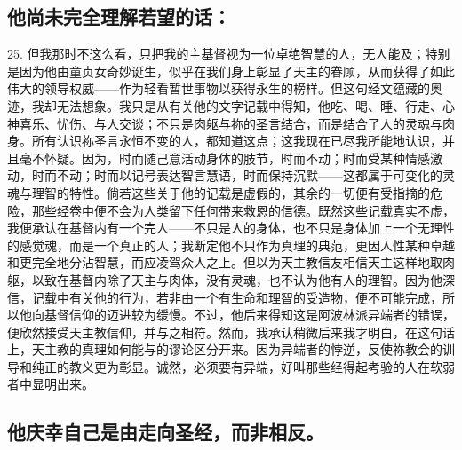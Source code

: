 
\subsection{他尚未完全理解若望的话：}

25. 但我那时不这么看，只把我的主基督视为一位卓绝智慧的人，无人能及；特别是因为他由童贞女奇妙诞生，似乎在我们身上彰显了天主的眷顾，从而获得了如此伟大的领导权威——作为轻看暂世事物以获得永生的榜样。但这句经文蕴藏的奥迹，我却无法想象。我只是从有关他的文字记载中得知，他吃、喝、睡、行走、心神喜乐、忧伤、与人交谈；不只是肉躯与祢的圣言结合，而是结合了人的灵魂与肉身。所有认识祢圣言永恒不变的人，都知道这点；这我现在已尽我所能地认识，并且毫不怀疑。因为，时而随己意活动身体的肢节，时而不动；时而受某种情感激动，时而不动；时而以记号表达智言慧语，时而保持沉默——这都属于可变化的灵魂与理智的特性。倘若这些关于他的记载是虚假的，其余的一切便有受指摘的危险，那些经卷中便不会为人类留下任何带来救恩的信德。既然这些记载真实不虚，我便承认在基督内有一个完人——不只是人的身体，也不只是身体加上一个无理性的感觉魂，而是一个真正的人；我断定他不只作为真理的典范，更因人性某种卓越和更完全地分沾智慧，而应凌驾众人之上。但以为天主教信友相信天主这样地取肉躯，以致在基督内除了天主与肉体，没有灵魂，也不认为他有人的理智。因为他深信，记载中有关他的行为，若非由一个有生命和理智的受造物，便不可能完成，所以他向基督信仰的迈进较为缓慢。不过，他后来得知这是阿波林派异端者的错误，便欣然接受天主教信仰，并与之相符。然而，我承认稍微后来我才明白，在这句话上，天主教的真理如何能与的谬论区分开来。因为异端者的悖逆，反使祢教会的训导和纯正的教义更为彰显。诚然，必须要有异端，好叫那些经得起考验的人在软弱者中显明出来。\par


\subsection{他庆幸自己是由走向圣经，而非相反。}

